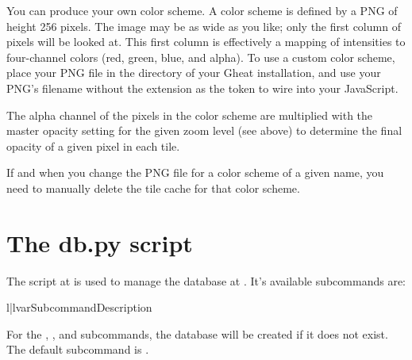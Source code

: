 \documentclass{manual}
\begin{document}
You can produce your own color scheme. A color scheme is defined by a PNG of
height 256 pixels. The image may be as wide as you like; only the first column
of pixels will be looked at. This first column is effectively a mapping of
intensities to four-channel colors (red, green, blue, and alpha). To use a
custom color scheme, place your PNG file in the 
directory of your Gheat installation, and use your PNG's filename without the
 extension as the token to wire into your JavaScript.

The alpha channel of the pixels in the color scheme are multiplied with the
master opacity setting for the given zoom level (see above) to determine the 
final opacity of a given pixel in each tile.

If and when you change the PNG file for a color scheme of a given name, you
need to manually delete the tile cache for that color scheme.

\begin{seealso}



\end{seealso}


\chapter{The db.py script}
\label{db.py}

The script at  is used to manage the database at 
. It's available subcommands are:

\begin{tableii}{l|l}{var}{Subcommand}{Description}
\end{tableii}

For the , , and  subcommands, the database will
be created if it does not exist. The default subcommand is . 
\end{document}
